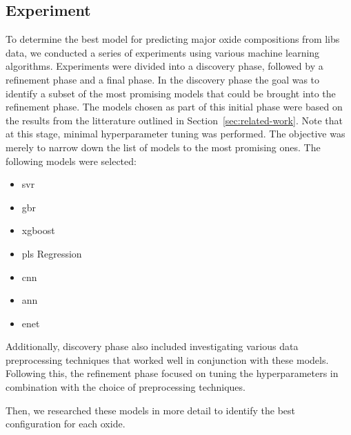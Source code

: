 \subsection{Experiment}
To determine the best model for predicting major oxide compositions from \gls{libs} data, we conducted a series of experiments using various machine learning algorithms.
Experiments were divided into a discovery phase, followed by a refinement phase and a final phase.
In the discovery phase the goal was to identify a subset of the most promising models that could be brought into the refinement phase. 
The models chosen as part of this initial phase were based on the results from the litterature outlined in Section~\ref{sec:related-work}.
Note that at this stage, minimal hyperparameter tuning was performed. The objective was merely to narrow down the list of models to the most promising ones.
The following models were selected:
\begin{itemize}
    \item \gls{svr}
    \item \gls{gbr}
    \item \gls{xgboost}
    \item \gls{pls} Regression
    \item \gls{cnn}
    \item \gls{ann}
    \item \gls{enet}
\end{itemize}

Additionally, discovery phase also included investigating various data preprocessing techniques that worked well in conjunction with these models. %
Following this, the refinement phase focused on tuning the hyperparameters in combination with the choice of preprocessing techniques.

Then, we researched these models in more detail to identify the best configuration for each oxide.






